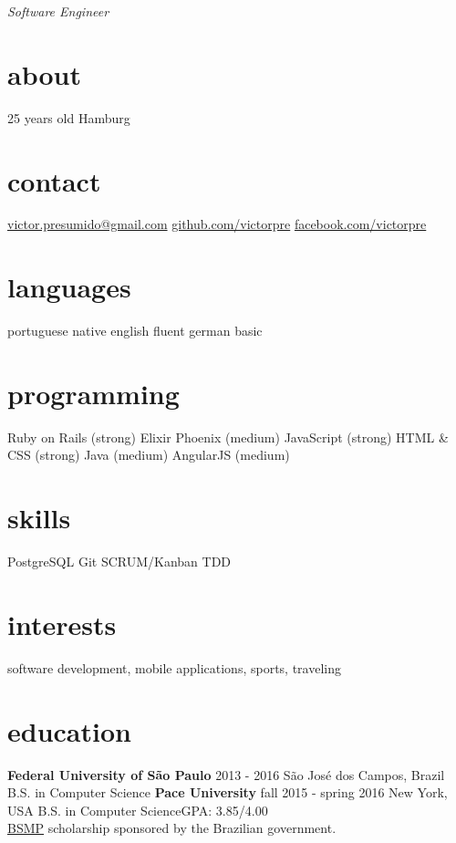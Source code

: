 \documentclass[]{friggeri-cv}
\begin{document}
       {\textit{Software Engineer}}


\begin{aside}
  \section{about}
	25 years old
	Hamburg
  \section{contact}
    {\footnotesize \href{mailto:victor.presumido@gmail.com}{victor.presumido@gmail.com}}
    \href{https://github.com/victorpre/}{github.com/victorpre}
    \href{http://facebook.com/victorpre}{facebook.com/victorpre}
  \section{languages}
    portuguese native
    english fluent
    german basic
  \section{programming}
    Ruby on Rails (strong)
    \small{Elixir Phoenix (medium)}
    JavaScript (strong)
    HTML \& CSS (strong)
    Java (medium)
    AngularJS  (medium)
 \section{skills}
	PostgreSQL
	Git
	SCRUM/Kanban
	TDD
\end{aside}


\section{interests}

software development, mobile applications, sports, traveling

\section{education}

\begin{entrylist}
  \entry
    {\textbf{Federal University of São Paulo}}
    {2013 - 2016}
    {São José dos Campos, Brazil}
    {B.S. in Computer Science}
  \entry
    {\textbf{Pace University}}
    {fall 2015 - spring 2016}
    {New York, USA}
    {B.S. in Computer Science\hfill{\small GPA: 3.85/4.00}\\
    \href{http://www.iie.org/programs/brazil-scientific-mobility}{BSMP} scholarship sponsored by the Brazilian government.}
 \end{entrylist}
\end{document}
